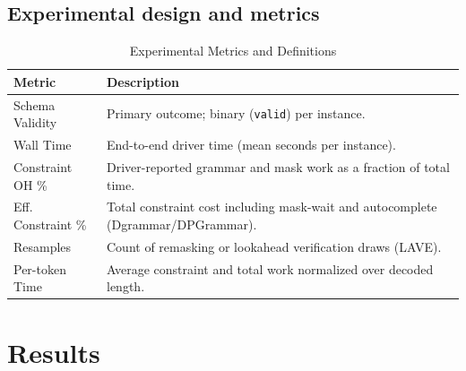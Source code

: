 \subsection{Experimental design and metrics}

\begin{table}[htbp]
\small
\caption{Experimental Metrics and Definitions}
\label{tab:metrics}
\begin{tabularx}{\columnwidth}{|l|X|}
\hline
\textbf{Metric} & \textbf{Description} \\ \hline
Schema Validity & Primary outcome; binary (\texttt{valid}) per instance. \\ \hline
Wall Time & End-to-end driver time (mean seconds per instance). \\ \hline
Constraint OH \% & Driver-reported grammar and mask work as a fraction of total time. \\ \hline
Eff. Constraint \% & Total constraint cost including mask-wait and autocomplete (Dgrammar/DPGrammar). \\ \hline
Resamples & Count of remasking or lookahead verification draws (LAVE). \\ \hline
Per-token Time & Average constraint and total work normalized over decoded length. \\ \hline
\end{tabularx}
\end{table}

\section{Results}
\label{sec:results}

